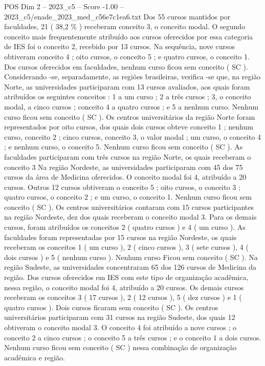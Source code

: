 \begin{textsample}{POS Dim 2 – 2023\_c5 – Score -1.00 – 2023\_c5/enade\_2023\_med\_c56e7c1ea6.txt}
Dos 55 cursos mantidos por faculdades, 21 ( 38,2 \% ) receberam conceito 3, o conceito modal.
O segundo conceito mais frequentemente atribuído aos cursos oferecidos por essa categoria de IES foi o conceito 2, recebido por 13 cursos.
Na sequência, nove cursos obtiveram conceito 4 ; oito cursos, o conceito 5 ; e quatro cursos, o conceito 1.
Dos cursos oferecidos em faculdades, nenhum curso ficou sem conceito ( SC ).
Considerando -se, separadamente, as regiões brasileiras, verifica -se que, na região Norte, as universidades participaram com 13 cursos avaliados, aos quais foram atribuídos os seguintes conceitos : 1 a um curso ; 2 a três cursos ; 3, o conceito modal, a cinco cursos ; conceito 4 a quatro cursos ; e 5 a nenhum curso.
Nenhum curso ficou sem conceito ( SC ).
Os centros universitários da região Norte foram representados por oito cursos, dos quais dois cursos obteve conceito 1 ; nenhum curso, conceito 2 ; cinco cursos, conceito 3, o valor modal ; um curso, o conceito 4 ; e nenhum curso, o conceito 5.
Nenhum curso ficou sem conceito ( SC ).
As faculdades participaram com três cursos na região Norte, os quais receberam o conceito 3 Na região Nordeste, as universidades participaram com 45 dos 75 cursos da área de Medicina oferecidos.
O conceito modal foi 4, atribuído a 20 cursos.
Outros 12 cursos obtiveram o conceito 5 ; oito cursos, o conceito 3 ; quatro cursos, o conceito 2 ; e um curso, o conceito 1.
Nenhum curso ficou sem conceito ( SC ).
Os centros universitários contaram com 15 cursos participantes na região Nordeste, dez dos quais receberam o conceito modal 3.
Para os demais cursos, foram atribuídos os conceitos 2 ( quatro cursos ) e 4 ( um curso ).
As faculdades foram representadas por 15 cursos na região Nordeste, os quais receberam os conceitos 1 ( um curso ), 2 ( cinco cursos ), 3 ( sete cursos ), 4 ( dois cursos ) e 5 ( nenhum curso ).
Nenhum curso Ficou sem conceito ( SC ).
Na região Sudeste, as universidades concentraram 65 dos 126 cursos de Medicina da região.
Dos cursos oferecidos em IES com este tipo de organização acadêmica, nessa região, o conceito modal foi 4, atribuído a 20 cursos.
Os demais cursos receberam os conceitos 3 ( 17 cursos ), 2 ( 12 cursos ), 5 ( dez cursos ) e 1 ( quatro cursos ).
Dois cursos ficaram sem conceito ( SC ).
Os centros universitários participaram com 31 cursos na região Sudeste, dos quais 12 obtiveram o conceito modal 3.
O conceito 4 foi atribuído a nove cursos ; o conceito 2 a cinco cursos ; o conceito 5 a três cursos ; e o conceito 1 a dois cursos.
Nenhum curso ficou sem conceito ( SC ) nessa combinação de organização acadêmica e região.

\end{textsample}
